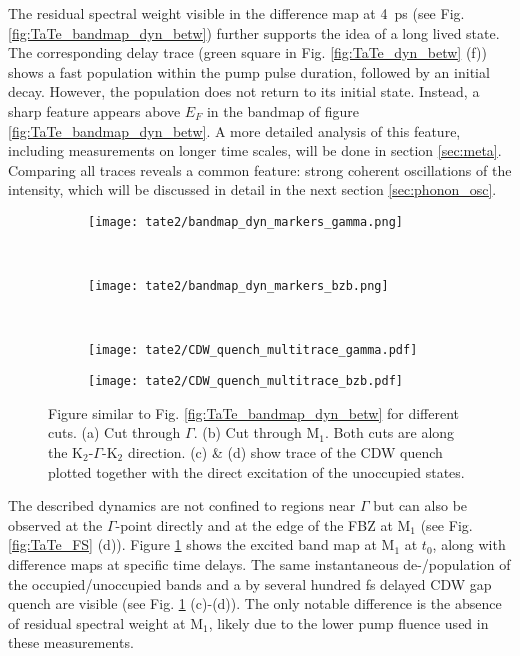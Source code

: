 The residual spectral weight visible in the difference map at \qty{4}{\pico\second} (see Fig. \ref{fig:TaTe_bandmap_dyn_betw}) further supports the idea of a long lived state.
The corresponding delay trace (green square in Fig. \ref{fig:TaTe_dyn_betw} (f)) shows a fast population within the pump pulse duration, followed by an initial decay.
However, the population does not return to its initial state.
Instead, a sharp feature appears above $E_F$ in the bandmap of figure \ref{fig:TaTe_bandmap_dyn_betw}.
A more detailed analysis of this feature, including measurements on longer time scales, will be done in section \ref{sec:meta}.
Comparing all traces reveals a common feature: strong coherent oscillations of the intensity, which will be discussed in detail in the next section \ref{sec:phonon_osc}.

\begin{figure}[t!]
	\centering
	\begin{subfigure}[b]{\textwidth}
		\texttt{[image: tate2/bandmap\_dyn\_markers\_gamma.png]}
		\caption{}
	\end{subfigure}
	\\
	\centering
	\begin{subfigure}[b]{\textwidth}
		\texttt{[image: tate2/bandmap\_dyn\_markers\_bzb.png]}
		\caption{}
	\end{subfigure}
	\\
	\begin{subfigure}[b]{0.33\textwidth}
		\texttt{[image: tate2/CDW\_quench\_multitrace\_gamma.pdf]}
		\caption{}
	\end{subfigure}
	\begin{subfigure}[b]{0.33\textwidth}
		\texttt{[image: tate2/CDW\_quench\_multitrace\_bzb.pdf]}
		\caption{}
	\end{subfigure}
	\caption{Figure similar to Fig. \ref{fig:TaTe_bandmap_dyn_betw} for different cuts. (a) Cut through $\Gamma$. (b) Cut through M$_1$. Both cuts are along the K$_2$-$\Gamma$-K$_2$ direction. (c) \& (d) show trace of the CDW quench plotted together with the direct excitation of the unoccupied states.}
	\label{fig:TaTe_bandmap_dyn_bzb}
\end{figure}

The described dynamics are not confined to regions near $\Gamma$ but can also be observed at the $\Gamma$-point directly and at the edge of the FBZ at M$_1$ (see Fig. \ref{fig:TaTe_FS} (d)).
Figure \ref{fig:TaTe_bandmap_dyn_bzb} shows the excited band map at M$_1$ at $t_0$, along with difference maps at specific time delays.
The same instantaneous de-/population of the occupied/unoccupied bands and a by several hundred \unit{\femto\second} delayed CDW gap quench are visible (see Fig. \ref{fig:TaTe_bandmap_dyn_bzb} (c)-(d)).
The only notable difference is the absence of residual spectral weight at M$_1$, likely due to the lower pump fluence used in these measurements.

